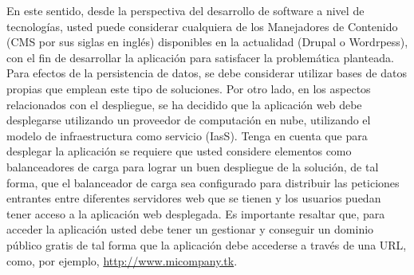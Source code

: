 En este sentido, desde la perspectiva del desarrollo de software a nivel de tecnologías, 
usted puede considerar cualquiera de los Manejadores de Contenido (CMS por sus siglas 
en inglés) disponibles en la actualidad (Drupal o Wordrpess), con el fin de desarrollar la 
aplicación para satisfacer la problemática planteada. Para efectos de la persistencia de 
datos, se debe considerar utilizar bases de datos propias que emplean este tipo de 
soluciones. 
Por otro lado, en los aspectos relacionados con el despliegue, se ha decidido que la 
aplicación web debe desplegarse utilizando un proveedor de computación en nube, 
utilizando el modelo de infraestructura como servicio (IasS). Tenga en cuenta que para 
desplegar la aplicación se requiere que usted considere elementos como balanceadores 
de carga para lograr un buen despliegue de la solución, de tal forma, que el balanceador 
de carga sea configurado para distribuir las peticiones entrantes entre diferentes 
servidores web que se tienen y los usuarios puedan tener acceso a la aplicación web 
desplegada. Es importante resaltar que, para acceder la aplicación usted debe tener un 
gestionar y conseguir un dominio público gratis de tal forma que la aplicación debe 
accederse a través de una URL, como, por ejemplo, \url{http://www.micompany.tk}.
